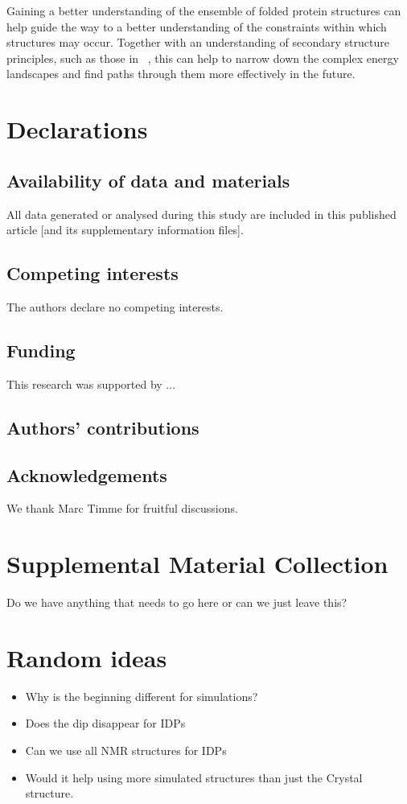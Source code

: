 \documentclass[
reprint,
twocolumn,
amsmath,amssymb,superscriptaddress,aps,
pre]{revtex4-1}
\newcommand{\red}[1]{\textcolor{red!80!black}{#1}}
\begin{document}
Gaining a better understanding of the ensemble of folded protein structures can help guide the way to a better understanding of the constraints within which structures may occur. Together with an understanding of secondary structure principles, such as those in
~\cite{Danielsson2010, Molkenthin2011}, this can help to narrow down the complex energy landscapes and find paths through them more effectively in the future.

\section*{Declarations}
\subsection{Availability of data and materials}
All data generated or analysed during this study are included in this published article [and its supplementary information files].
\subsection{Competing interests}
The authors declare no competing interests.
\subsection{Funding}
This research was supported by ...
\subsection{Authors' contributions}

\subsection{Acknowledgements}
We thank Marc Timme for fruitful discussions.




\appendix
\section{Supplemental Material Collection}
\red{Do we have anything that needs to go here or can we just leave this?}
\section{Random ideas}
\begin{itemize}
    \item Why is the beginning different for simulations?
    \item Does the dip disappear for IDPs
    \item Can we use all NMR structures for IDPs
    \item Would it help using more simulated structures than just the Crystal structure. 
\end{itemize}
\end{document}
